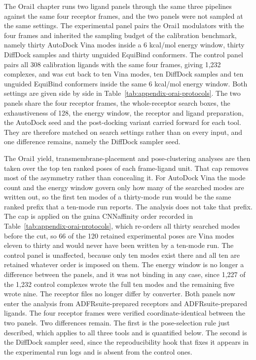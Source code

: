 The Orai1 chapter runs two ligand panels through the same three pipelines against the same four receptor frames, and the two panels were not sampled at the same settings. The experimental panel pairs the Orai1 modulators with the four frames and inherited the sampling budget of the calibration benchmark, namely thirty AutoDock Vina modes inside a 6 kcal/mol energy window, thirty DiffDock samples and thirty unguided EquiBind conformers. The control panel pairs all 308 calibration ligands with the same four frames, giving 1,232 complexes, and was cut back to ten Vina modes, ten DiffDock samples and ten unguided EquiBind conformers inside the same 6 kcal/mol energy window. Both settings are given side by side in Table~\ref{tab:appendix-orai-protocols}. The two panels share the four receptor frames, the whole-receptor search boxes, the exhaustiveness of 128, the energy window, the receptor and ligand preparation, the AutoDock seed and the post-docking variant carried forward for each tool. They are therefore matched on search settings rather than on every input, and one difference remains, namely the DiffDock sampler seed.

The Orai1 yield, transmembrane-placement and pose-clustering analyses are then taken over the top ten ranked poses of each frame-ligand unit. That cap removes most of the asymmetry rather than concealing it. For AutoDock Vina the mode count and the energy window govern only how many of the searched modes are written out, so the first ten modes of a thirty-mode run would be the same ranked prefix that a ten-mode run reports. The analysis does not take that prefix. The cap is applied on the gnina CNNaffinity order recorded in Table~\ref{tab:appendix-orai-protocols}, which re-orders all thirty searched modes before the cut, so 66 of the 120 retained experimental poses are Vina modes eleven to thirty and would never have been written by a ten-mode run. The control panel is unaffected, because only ten modes exist there and all ten are retained whatever order is imposed on them. The energy window is no longer a difference between the panels, and it was not binding in any case, since 1,227 of the 1,232 control complexes wrote the full ten modes and the remaining five wrote nine. The receptor files no longer differ by converter. Both panels now enter the analysis from ADFRsuite-prepared receptors and ADFRsuite-prepared ligands. The four receptor frames were verified coordinate-identical between the two panels. Two differences remain. The first is the pose-selection rule just described, which applies to all three tools and is quantified below. The second is the DiffDock sampler seed, since the reproducibility hook that fixes it appears in the experimental run logs and is absent from the control ones.

